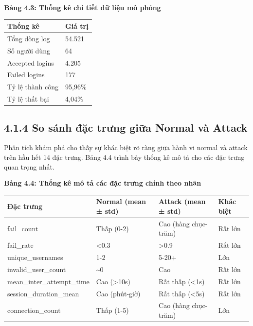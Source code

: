 \documentclass[
  a4paper]{report}
\newcounter{none} %
\begin{document}
\textbf{Bảng 4.3: Thống kê chi tiết dữ liệu mô phỏng}

{\def\LTcaptype{none} %
\begin{longtable}[]{@{}ll@{}}
\toprule\noalign{}
Thống kê & Giá trị \\
\midrule\noalign{}
\endhead
\bottomrule\noalign{}
\endlastfoot
Tổng dòng log & 54.521 \\
Số người dùng & 64 \\
Accepted logins & 4.205 \\
Failed logins & 177 \\
Tỷ lệ thành công & 95,96\% \\
Tỷ lệ thất bại & 4,04\% \\
\end{longtable}
}

\subsection{4.1.4 So sánh đặc trưng giữa Normal và
Attack}\label{so-suxe1nh-ux111ux1eb7c-trux1b0ng-giux1eefa-normal-vuxe0-attack}

Phân tích khám phá cho thấy sự khác biệt rõ ràng giữa hành vi normal và
attack trên hầu hết 14 đặc trưng. Bảng 4.4 trình bày thống kê mô tả cho
các đặc trưng quan trọng nhất.

\textbf{Bảng 4.4: Thống kê mô tả các đặc trưng chính theo nhãn}

{\def\LTcaptype{none} %
\begin{longtable}[]{@{}llll@{}}
\toprule\noalign{}
Đặc trưng & Normal (mean ± std) & Attack (mean ± std) & Khác biệt \\
\midrule\noalign{}
\endhead
\bottomrule\noalign{}
\endlastfoot
fail\_count & Thấp (0-2) & Cao (hàng chục-trăm) & Rất lớn \\
fail\_rate & \textless0.3 & \textgreater0.9 & Rất lớn \\
unique\_usernames & 1-2 & 5-20+ & Lớn \\
invalid\_user\_count & \textasciitilde0 & Cao & Rất lớn \\
mean\_inter\_attempt\_time & Cao (\textgreater10s) & Rất thấp
(\textless1s) & Rất lớn \\
session\_duration\_mean & Cao (phút-giờ) & Rất thấp (\textless5s) & Rất
lớn \\
connection\_count & Thấp (1-5) & Cao (hàng chục-trăm) & Lớn \\
\end{longtable}
}
\end{document}

